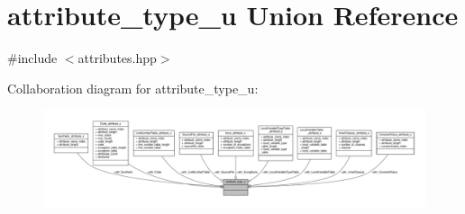 \hypertarget{unionattribute__type__u}{\section{attribute\+\_\+type\+\_\+u Union Reference}
\label{unionattribute__type__u}
}


{\ttfamily \#include $<$attributes.\+hpp$>$}



Collaboration diagram for attribute\+\_\+type\+\_\+u\+:\nopagebreak
\begin{figure}[H]
\begin{center}
\leavevmode
\includegraphics[width=350pt]{unionattribute__type__u__coll__graph}
\end{center}
\end{figure}
